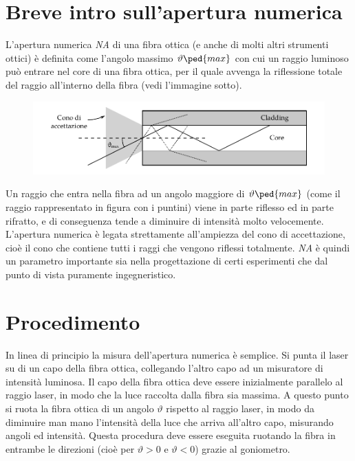 \section{Breve intro sull'apertura numerica}

L'apertura numerica \emph{NA} di una fibra ottica (e anche di molti altri strumenti ottici) è definita come l'angolo massimo $\vartheta\ped{max}$
con cui un raggio luminoso può entrare nel core di una fibra ottica, per il quale avvenga la riflessione totale del raggio all'interno
della fibra (vedi l'immagine sotto).

\begin{figure}[h]
    \includegraphics[width=150mm]{fiber.pdf}
\end{figure}

Un raggio che entra nella fibra ad un angolo maggiore di $\vartheta\ped{max}$ (come il raggio rappresentato in figura con i puntini)
viene in parte riflesso ed in parte rifratto, e di conseguenza tende a diminuire di intensità molto velocemente.
L'apertura numerica è legata strettamente all'ampiezza del cono di accettazione, cioè il cono che contiene tutti i raggi che vengono
riflessi totalmente. \emph{NA} è quindi un parametro importante sia nella progettazione di certi esperimenti che dal punto
di vista puramente ingegneristico.

\section{Procedimento}

In linea di principio la misura dell'apertura numerica è semplice. Si punta il laser su di un capo della fibra ottica, collegando
l'altro capo ad un misuratore di intensità luminosa. Il capo della fibra ottica deve essere inizialmente parallelo al raggio laser,
in modo che la luce raccolta dalla fibra sia massima. A questo punto si ruota la fibra ottica di un angolo $\vartheta$ rispetto al raggio laser,
in modo da diminuire man mano l'intensità della luce che arriva all'altro capo, misurando angoli ed intensità. Questa procedura
deve essere eseguita ruotando la fibra in entrambe le direzioni (cioè per $\vartheta > 0$ e $\vartheta < 0$) grazie al goniometro.

